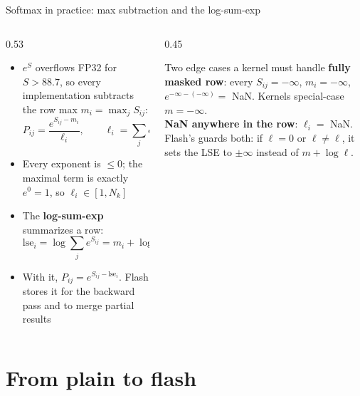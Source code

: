 \documentclass[aspectratio=169,11pt]{beamer}
\newcommand{\code}[1]{\texttt{\detokenize{#1}}}
\newcommand{\NaN}{NaN}
\begin{document}
\begin{frame}{Softmax in practice: max subtraction and the log-sum-exp}
\begin{columns}[T]
\begin{column}{0.53\textwidth}
\begin{itemize}\small
\item $e^{S}$ overflows FP32 for $S>88.7$, so every implementation subtracts the row max $m_i=\max_j S_{ij}$:
\[
P_{ij} = \frac{e^{S_{ij}-m_i}}{\ell_i},\qquad \ell_i = \sum_j e^{S_{ij}-m_i}
\]
\item Every exponent is $\le 0$; the maximal term is exactly $e^0=1$, so $\ell_i\in[1,N_k]$
\item The \textbf{log-sum-exp} summarizes a row:
\[
\mathrm{lse}_i = \log\sum_j e^{S_{ij}} = m_i + \log \ell_i
\]
\item With it, $P_{ij}=e^{S_{ij}-\mathrm{lse}_i}$. Flash stores it for the backward pass and to merge partial results
\end{itemize}
\end{column}
\begin{column}{0.45\textwidth}
\begin{block}{Two edge cases a kernel must handle}\small
\textbf{fully masked row}: every $S_{ij}=-\infty$, $m_i=-\infty$, $e^{-\infty-(-\infty)}=$ \NaN{}. Kernels special-case $m=-\infty$.\\[2mm]
\textbf{\NaN{} anywhere in the row}: $\ell_i=$ \NaN{}.\\[2mm]
Flash's \code{softmax.h} guards both: if $\ell=0$ or $\ell\neq\ell$, it sets the LSE to $\pm\infty$ instead of $m+\log\ell$.
\end{block}
\end{column}
\end{columns}
\end{frame}

\section{From plain to flash}
\end{document}
